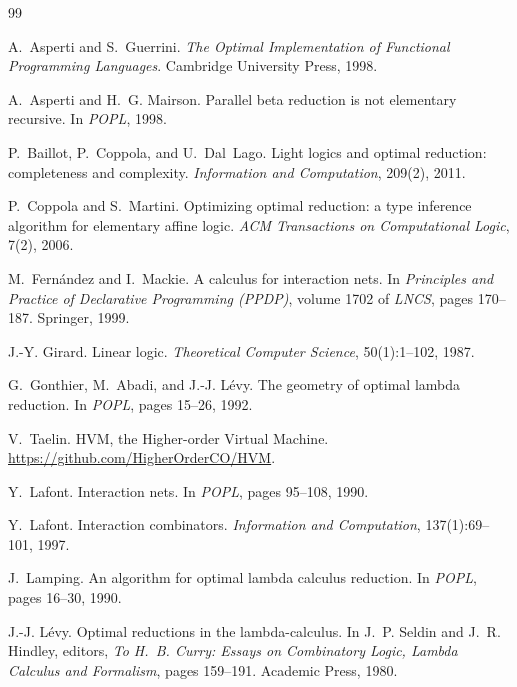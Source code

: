 \documentclass[11pt,a4paper]{article}
\theoremstyle{definition}
\theoremstyle{plain}
\begin{document}
\begin{thebibliography}{99}

A.~Asperti and S.~Guerrini.
\newblock \emph{The Optimal Implementation of Functional Programming
  Languages}.
\newblock Cambridge University Press, 1998.

A.~Asperti and H.~G. Mairson.
\newblock Parallel beta reduction is not elementary recursive.
\newblock In \emph{POPL}, 1998.

P.~Baillot, P.~Coppola, and U.~Dal~Lago.
\newblock Light logics and optimal reduction: completeness and complexity.
\newblock \emph{Information and Computation}, 209(2), 2011.

P.~Coppola and S.~Martini.
\newblock Optimizing optimal reduction: a type inference algorithm for
  elementary affine logic.
\newblock \emph{ACM Transactions on Computational Logic}, 7(2), 2006.

M.~Fernández and I.~Mackie.
\newblock A calculus for interaction nets.
\newblock In \emph{Principles and Practice of Declarative Programming (PPDP)},
  volume 1702 of \emph{LNCS}, pages 170--187. Springer, 1999.

J.-Y. Girard.
\newblock Linear logic.
\newblock \emph{Theoretical Computer Science}, 50(1):1--102, 1987.

G.~Gonthier, M.~Abadi, and J.-J. Lévy.
\newblock The geometry of optimal lambda reduction.
\newblock In \emph{POPL}, pages 15--26, 1992.

V.~Taelin.
\newblock HVM, the Higher-order Virtual Machine.
\newblock \url{https://github.com/HigherOrderCO/HVM}.

Y.~Lafont.
\newblock Interaction nets.
\newblock In \emph{POPL}, pages 95--108, 1990.

Y.~Lafont.
\newblock Interaction combinators.
\newblock \emph{Information and Computation}, 137(1):69--101, 1997.

J.~Lamping.
\newblock An algorithm for optimal lambda calculus reduction.
\newblock In \emph{POPL}, pages 16--30, 1990.

J.-J. Lévy.
\newblock Optimal reductions in the lambda-calculus.
\newblock In J.~P. Seldin and J.~R. Hindley, editors, \emph{To H.~B. Curry:
  Essays on Combinatory Logic, Lambda Calculus and Formalism}, pages
  159--191. Academic Press, 1980.


\end{thebibliography}
\end{document}
